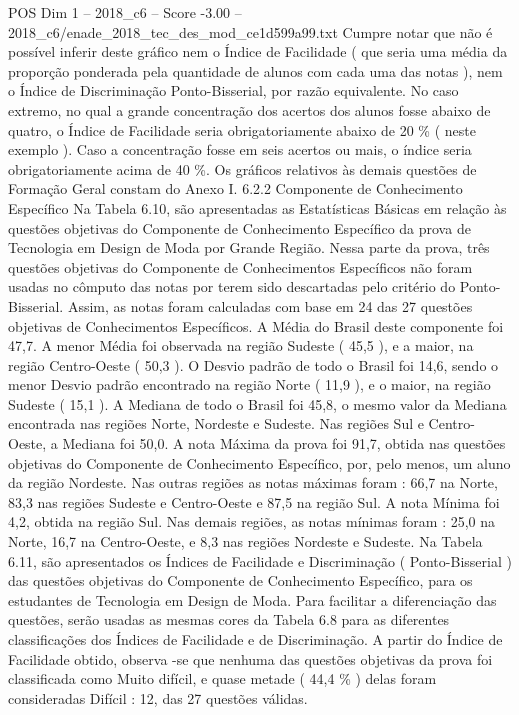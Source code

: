 \begin{textsample}{POS Dim 1 – 2018\_c6 – Score -3.00 – 2018\_c6/enade\_2018\_tec\_des\_mod\_ce1d599a99.txt}
Cumpre notar que não é possível inferir deste gráfico nem o Índice de Facilidade ( que seria uma média da proporção ponderada pela quantidade de alunos com cada uma das notas ), nem o Índice de Discriminação Ponto-Bisserial, por razão equivalente.
No caso extremo, no qual a grande concentração dos acertos dos alunos fosse abaixo de quatro, o Índice de Facilidade seria obrigatoriamente abaixo de 20 \% ( neste exemplo ).
Caso a concentração fosse em seis acertos ou mais, o índice seria obrigatoriamente acima de 40 \%.
Os gráficos relativos às demais questões de Formação Geral constam do Anexo I. 6.2.2 Componente de Conhecimento Específico Na Tabela 6.10, são apresentadas as Estatísticas Básicas em relação às questões objetivas do Componente de Conhecimento Específico da prova de Tecnologia em Design de Moda por Grande Região.
Nessa parte da prova, três questões objetivas do Componente de Conhecimentos Específicos não foram usadas no cômputo das notas por terem sido descartadas pelo critério do Ponto-Bisserial.
Assim, as notas foram calculadas com base em 24 das 27 questões objetivas de Conhecimentos Específicos.
A Média do Brasil deste componente foi 47,7.
A menor Média foi observada na região Sudeste ( 45,5 ), e a maior, na região Centro-Oeste ( 50,3 ).
O Desvio padrão de todo o Brasil foi 14,6, sendo o menor Desvio padrão encontrado na região Norte ( 11,9 ), e o maior, na região Sudeste ( 15,1 ).
A Mediana de todo o Brasil foi 45,8, o mesmo valor da Mediana encontrada nas regiões Norte, Nordeste e Sudeste.
Nas regiões Sul e Centro-Oeste, a Mediana foi 50,0.
A nota Máxima da prova foi 91,7, obtida nas questões objetivas do Componente de Conhecimento Específico, por, pelo menos, um aluno da região Nordeste.
Nas outras regiões as notas máximas foram : 66,7 na Norte, 83,3 nas regiões Sudeste e Centro-Oeste e 87,5 na região Sul.
A nota Mínima foi 4,2, obtida na região Sul.
Nas demais regiões, as notas mínimas foram : 25,0 na Norte, 16,7 na Centro-Oeste, e 8,3 nas regiões Nordeste e Sudeste.
Na Tabela 6.11, são apresentados os Índices de Facilidade e Discriminação ( Ponto-Bisserial ) das questões objetivas do Componente de Conhecimento Específico, para os estudantes de Tecnologia em Design de Moda.
Para facilitar a diferenciação das questões, serão usadas as mesmas cores da Tabela 6.8 para as diferentes classificações dos Índices de Facilidade e de Discriminação.
A partir do Índice de Facilidade obtido, observa -se que nenhuma das questões objetivas da prova foi classificada como Muito difícil, e quase metade ( 44,4 \% ) delas foram consideradas Difícil : 12, das 27 questões válidas.

\end{textsample}
